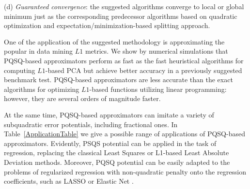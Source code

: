 \documentclass[preprint,12pt,twocolumn]{elsarticle}
\begin{document}
(d) \textit{Guaranteed convergence}: the suggested algorithms converge to local or global minimum just as the corresponding predecessor algorithms based on quadratic optimization and expectation/minimization-based splitting approach.

One of the application of the suggested methodology is approximating the popular in data mining $L1$ metrics. We show by numerical simulations that PQSQ-based approximators perform as fast as the fast heuristical algorithms for computing $L1$-based PCA but achieve better accuracy in a previously suggested benchmark test. PQSQ-based approximators are less accurate than the exact algorithms for optimizing $L1$-based functions utilizing linear programming: however, they are several orders of magnitude faster.

At the same time, PQSQ-based approximators can imitate a variety of subquadratic error potentials, including fractional ones. In Table~\ref{ApplicationTable} we give a possible range of applications of PQSQ-based approximators. Evidently, PSQS potential can be applied in the task of regression, replacing the classical Least Squares or L1-based Least Absolute Deviation methods. Moreover, PQSQ potential can be easily adapted to the problems of regularized regression with non-quadratic penalty onto the regression coefficients, such as LASSO \cite{Tibshirani1996} or Elastic Net \cite{Zou2005}.











\end{document}
